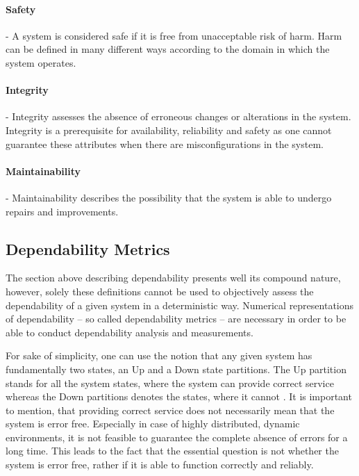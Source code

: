 \paragraph{Safety}- A system is considered safe if it is free from unacceptable risk of harm. Harm can be defined in many different ways according to the domain in which the system operates.

\paragraph{Integrity}- Integrity assesses the absence of erroneous changes or alterations in the system. Integrity is a prerequisite for availability, reliability and safety as one cannot guarantee these attributes when there are misconfigurations in the system.

\paragraph{Maintainability}- Maintainability describes the possibility that the system is able to undergo repairs and improvements.


\subsection{Dependability Metrics}

The section above describing dependability presents well its compound nature, however, solely these definitions cannot be used to objectively assess the dependability of a given system in a deterministic way. Numerical representations of dependability -- so called dependability metrics -- are necessary in order to be able to conduct dependability analysis and measurements.

For sake of simplicity, one can use the notion that any given system has fundamentally two states, an Up and a Down state partitions. The Up partition stands for all the system states, where the system can provide correct service whereas the Down partitions denotes the states, where it cannot \cite{DependabilityBMEMIT}. It is important to mention, that providing correct service does not necessarily mean that the system is error free. Especially in case of highly distributed, dynamic environments, it is not feasible to guarantee the complete absence of errors for a long time. This leads to the fact that the essential question is not whether the system is error free, rather if it is able to function correctly and reliably.

